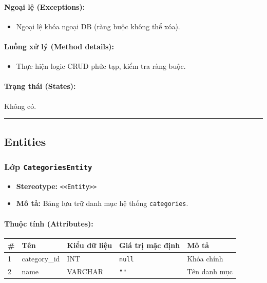 \documentclass[12pt,a4paper]{article}
\begin{document}
\paragraph{Ngoại lệ (Exceptions):}
\begin{itemize}[leftmargin=*]
    \item Ngoại lệ khóa ngoại DB (ràng buộc không thể xóa).
\end{itemize}


\paragraph{Luồng xử lý (Method details):}
\begin{itemize}[leftmargin=*]
    \item Thực hiện logic CRUD phức tạp, kiểm tra ràng buộc.
\end{itemize}


\paragraph{Trạng thái (States):}
Không có.

\vskip 0.5cm
\noindent\rule{\textwidth}{0.5pt}
\vskip 0.5cm

\subsection{Entities}

\subsubsection{Lớp \texttt{CategoriesEntity}}
\begin{itemize}[leftmargin=*]
    \item \textbf{Stereotype:} \texttt{\textless{}\textless{}Entity\textgreater{}\textgreater{}}
    \item \textbf{Mô tả:} Bảng lưu trữ danh mục hệ thống \texttt{categories}.
\end{itemize}

\paragraph{Thuộc tính (Attributes):}
\begin{longtable}{|p{0.6cm}|p{2.8cm}|p{2.2cm}|p{1.8cm}|p{5.8cm}|}
\hline
\textbf{\#} & \textbf{Tên} & \textbf{Kiểu dữ liệu} & \textbf{Giá trị mặc định} & \textbf{Mô tả} \\ \hline
\endhead
1 & category\_id & INT & \texttt{null} & Khóa chính \\ \hline
2 & name & VARCHAR & \texttt{""} & Tên danh mục \\ \hline
\end{longtable}
\end{document}
